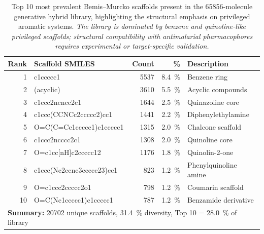 \documentclass[journal=jcisd8,manuscript=suppinfo]{achemso}
\begin{document}
\begin{table}[!htbp]
\centering
\caption{Top \num{10} most prevalent Bemis--Murcko scaffolds present in the \num{65856}-molecule generative hybrid library, highlighting the structural emphasis on privileged aromatic systems. \textit{The library is dominated by benzene and quinoline-like privileged scaffolds; structural compatibility with antimalarial pharmacophores requires experimental or target-specific validation.}}
\label{tab:scaffolds}
\begin{tabular}{@{}r l r r l@{}}
\toprule
\textbf{Rank} & \textbf{Scaffold SMILES} & \textbf{Count} & \textbf{\unit{\percent}} & \textbf{Description} \\
\midrule
\num{1} & c1ccccc1 & \num{5537} & \qty{8.4}{\percent} & Benzene ring \\
\num{2} & (acyclic) & \num{3610} & \qty{5.5}{\percent} & Acyclic compounds \\
\num{3} & c1ccc2ncncc2c1 & \num{1644} & \qty{2.5}{\percent} & Quinazoline core \\
\num{4} & c1ccc(CCNCc2ccccc2)cc1 & \num{1441} & \qty{2.2}{\percent} & Diphenylethylamine \\
\num{5} & O=C(C=Cc1ccccc1)c1ccccc1 & \num{1315} & \qty{2.0}{\percent} & Chalcone scaffold \\
\num{6} & c1ccc2ncccc2c1 & \num{1308} & \qty{2.0}{\percent} & Quinoline core \\
\num{7} & O=c1cc[nH]c2ccccc12 & \num{1176} & \qty{1.8}{\percent} & Quinolin-2-one \\
\num{8} & c1ccc(Nc2ccnc3ccccc23)cc1 & \num{823} & \qty{1.2}{\percent} & Phenylquinoline amine \\
\num{9} & O=c1ccc2ccccc2o1 & \num{798} & \qty{1.2}{\percent} & Coumarin scaffold \\
\num{10} & O=C(Nc1ccccc1)c1ccccc1 & \num{787} & \qty{1.2}{\percent} & Benzamide derivative \\
\midrule
\multicolumn{5}{l}{\textbf{Summary:} \num{20702} unique scaffolds, \qty{31.4}{\percent} diversity, Top \num{10} = \qty{28.0}{\percent} of library} \\
\bottomrule
\end{tabular}
\end{table}
\end{document}

